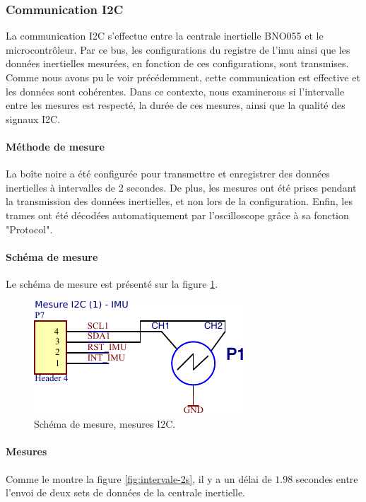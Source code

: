 \subsubsection{Communication I2C} \label{ssec:Comm-I2C}
La communication I2C s'effectue entre la centrale inertielle BNO055 et le microcontrôleur. Par ce bus, les configurations du registre de l'\gls{imu} ainsi que les données inertielles mesurées, en fonction de ces configurations, sont transmises. Comme nous avons pu le voir précédemment, cette communication est effective et les données sont cohérentes. Dans ce contexte, nous examinerons si l'intervalle entre les mesures est respecté, la durée de ces mesures, ainsi que la qualité des signaux I2C.


\paragraph{Méthode de mesure}
La boîte noire a été configurée pour transmettre et enregistrer des données inertielles à intervalles de 2 secondes. De plus, les mesures ont été prises pendant la transmission des données inertielles, et non lors de la configuration. Enfin, les trames ont été décodées automatiquement par l'oscilloscope grâce à sa fonction "Protocol".

\paragraph{Schéma de mesure} Le schéma de mesure est présenté sur la figure \ref{fig:schema-mesure-i2c}.


\begin{figure}[H]
	\centering
	\includegraphics[width=0.4\linewidth]{../figures/mesures/I2C/Schema-mesure-i2c}
	\caption{Schéma de mesure, mesures I2C.}
	\label{fig:schema-mesure-i2c}
\end{figure}

\paragraph{Mesures}
Comme le montre la figure \ref{fig:intervale-2s}, il y a un délai de $1.98$ secondes entre l'envoi de deux sets de données de la centrale inertielle.


